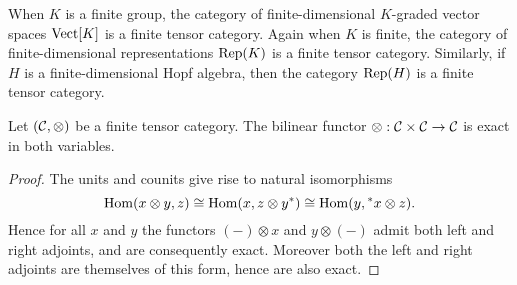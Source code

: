 \documentclass{amsart}
\begin{document}
\begin{example}
When $K$ is a finite group, the category of finite-dimensional $K$-graded vector spaces $\mathrm{Vect}[K]$ is a finite tensor category.  Again when $K$ is finite, the category of finite-dimensional representations $\mathrm{Rep}(K)$ is a finite tensor category.  Similarly, if $H$ is a finite-dimensional Hopf algebra, then the category $\mathrm{Rep}(H)$ is a finite tensor category.%
\end{example}


\begin{lemma} \cite[2.1.8]{MR1797619} \cite[Prop. 1.13.1]{EGNO}  \label{lma:RigidIsExact}
	Let $(\mathcal C, \otimes)$ be a finite tensor category. The bilinear functor $\otimes: \mathcal C \times \mathcal C \to \mathcal C$ is exact in both variables. 
\end{lemma}

\begin{proof}
	The units and counits give rise to natural isomorphisms
 \begin{equation*} 
 	\operatorname{Hom}(x \otimes y, z) \cong \operatorname{Hom}( x, z \otimes y^*) \cong \operatorname{Hom}(y, {}^*x \otimes z).
 \end{equation*}
	Hence for all $x$ and $y$ the functors $(-)\otimes x$ and $y \otimes (-)$ admit both left and right adjoints, and are consequently exact. Moreover both the left and right adjoints are themselves of this form, hence are also  exact. 
\end{proof}  


\end{document}
